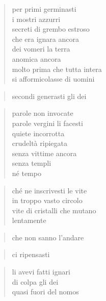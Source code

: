 \clearpage



	\begin{verse}
		per primi germinasti\\
		i mostri azzurri\\
		secreti di grembo estroso\\
		che era ignara ancora\\
		dei vomeri la terra\\
		anomica ancora\\
		molto prima che tutta intera\\
		si afformicolasse di uomini
	\end{verse}

\clearpage



	\begin{verse}
		secondi generasti gli dei
	\end{verse}

	\begin{verse}
		parole non invocate\\
		parole vergini li facesti\\
		quiete incorrotta\\
		crudeltà ripiegata\\
		senza vittime ancora\\
		senza templi\\
		né tempo
	\end{verse}

	\begin{verse}
		ché ne inscrivesti le vite\\
		in troppo vasto circolo\\
		vite di cristalli che mutano\\
		lentamente
	\end{verse}

	\begin{verse}
		che non sanno l’andare
	\end{verse}

\clearpage



	\begin{verse}
		ci ripensasti
	\end{verse}

	\begin{verse}
		li avevi fatti ignari\\
		di colpa gli dei\\
		quasi fuori del nomos
	\end{verse}

